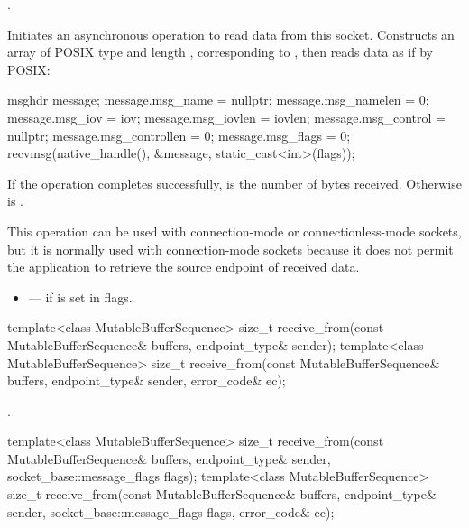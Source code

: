 \begin{itemdescr}
\pnum
\completionsig {}.

\pnum
\effects Initiates an asynchronous operation to read data from this socket. Constructs an array  of POSIX type  and length , corresponding to , then reads data as if by POSIX:
\begin{codeblock}
msghdr message;
message.msg_name = nullptr;
message.msg_namelen = 0;
message.msg_iov = iov;
message.msg_iovlen = iovlen;
message.msg_control = nullptr;
message.msg_controllen = 0;
message.msg_flags = 0;
recvmsg(native_handle(), &message, static_cast<int>(flags));
\end{codeblock}


\pnum
If the operation completes successfully,  is the number of bytes received. Otherwise  is .

\pnum
 \begin{note} This operation can be used with connection-mode or connectionless-mode sockets, but it is normally used with connection-mode sockets because it does not permit the application to retrieve the source endpoint of received data. \end{note}

\pnum
\errors
\begin{itemize}
\item
{} --- if  is set in flags.
\end{itemize}
\end{itemdescr}

\begin{itemdecl}
template<class MutableBufferSequence>
  size_t receive_from(const MutableBufferSequence& buffers,
                      endpoint_type& sender);
template<class MutableBufferSequence>
  size_t receive_from(const MutableBufferSequence& buffers,
                      endpoint_type& sender, error_code& ec);
\end{itemdecl}

\begin{itemdescr}
\pnum
\returns {}.
\end{itemdescr}

\begin{itemdecl}
template<class MutableBufferSequence>
  size_t receive_from(const MutableBufferSequence& buffers,
                      endpoint_type& sender,
                      socket_base::message_flags flags);
template<class MutableBufferSequence>
  size_t receive_from(const MutableBufferSequence& buffers,
                      endpoint_type& sender,
                      socket_base::message_flags flags,
                      error_code& ec);
\end{itemdecl}

